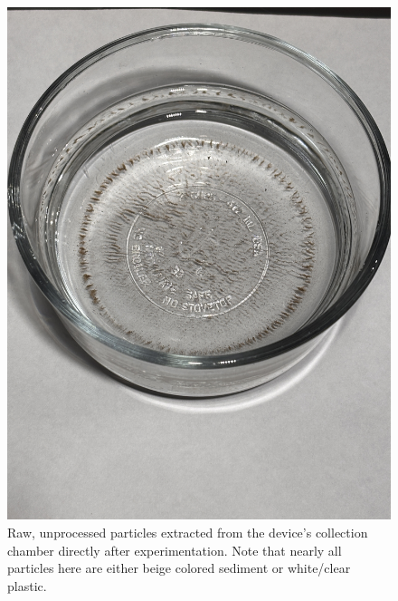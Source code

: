 \documentclass[fleqn,10pt]{SelfArx} %
\begin{document}
	
	\begin{figure}[h]
		\centering
		\includegraphics[angle=270,origin=c,width=1\linewidth]{Figures/RawSeparated}
		\caption[Raw Separated Plastics]{Raw, unprocessed particles extracted from the device's collection chamber directly after experimentation. Note that nearly all particles here are either beige colored sediment or white/clear plastic.}
		\label{fig:rawseparated}
	\end{figure}
\end{document}
